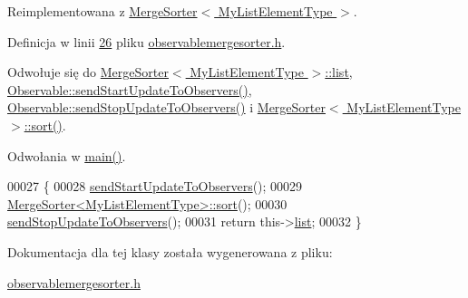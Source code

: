 Reimplementowana z \hyperlink{class_merge_sorter_aaee4333eb37af6401eca60da3398e507}{Merge\-Sorter$<$ My\-List\-Element\-Type $>$}.



Definicja w linii \hyperlink{observablemergesorter_8h_source_l00026}{26} pliku \hyperlink{observablemergesorter_8h_source}{observablemergesorter.\-h}.



Odwołuje się do \hyperlink{mergesorter_8h_source_l00020}{Merge\-Sorter$<$ My\-List\-Element\-Type $>$\-::list}, \hyperlink{observable_8h_source_l00029}{Observable\-::send\-Start\-Update\-To\-Observers()}, \hyperlink{observable_8h_source_l00039}{Observable\-::send\-Stop\-Update\-To\-Observers()} i \hyperlink{mergesorter_8h_source_l00095}{Merge\-Sorter$<$ My\-List\-Element\-Type $>$\-::sort()}.



Odwołania w \hyperlink{main_8cpp_source_l00022}{main()}.


\begin{DoxyCode}
00027         \{
00028                 \hyperlink{class_observable_a78df64057f152342a43f27979186a6ba}{sendStartUpdateToObservers}();
00029                 \hyperlink{class_merge_sorter_aaee4333eb37af6401eca60da3398e507}{MergeSorter<MyListElementType>::sort}();
00030                 \hyperlink{class_observable_a16f75ed1514a0cb7526b5a5d2b7ca7c6}{sendStopUpdateToObservers}();
00031                 \textcolor{keywordflow}{return} this->\hyperlink{class_merge_sorter_a8ac3ee938414809d7da627cf918f1f87}{list};
00032         \}
\end{DoxyCode}


Dokumentacja dla tej klasy została wygenerowana z pliku\-:\begin{DoxyCompactItemize}
\item 
\hyperlink{observablemergesorter_8h}{observablemergesorter.\-h}\end{DoxyCompactItemize}
